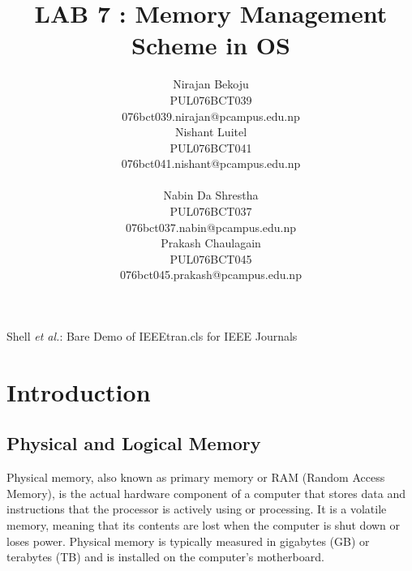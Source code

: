 \documentclass[journal,onecolumn]{IEEEtran}
\begin{document}
\title{LAB 7 : Memory Management Scheme in OS}

\author{
  \begin{multicols}{2}
    \centering
    Nirajan Bekoju\\
    PUL076BCT039\\
    076bct039.nirajan@pcampus.edu.np\\
    \columnbreak
    Nishant Luitel\\
    PUL076BCT041 \\
    076bct041.nishant@pcampus.edu.np \\
  \end{multicols}
  \begin{multicols}{2}
    \centering
    Nabin Da Shrestha\\
    PUL076BCT037 \\
    076bct037.nabin@pcampus.edu.np \\
    \columnbreak
    Prakash Chaulagain \\
    PUL076BCT045 \\
    076bct045.prakash@pcampus.edu.np
  \end{multicols}
}


%
{Shell \MakeLowercase{\textit{et al.}}: Bare Demo of IEEEtran.cls for IEEE Journals}

\maketitle

\IEEEpeerreviewmaketitle



\section{Introduction}
\subsection{Physical and Logical Memory}
Physical memory, also known as primary memory or RAM (Random Access Memory), is the actual hardware component of a computer that stores data and instructions that the processor is actively using or processing. It is a volatile memory, meaning that its contents are lost when the computer is shut down or loses power. Physical memory is typically measured in gigabytes (GB) or terabytes (TB) and is installed on the computer's motherboard.
\end{document}
